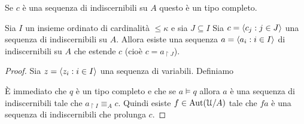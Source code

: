 \begin{comment}


\def\EMtp{{\rm {\small EM}\mbox{-}tp}}

Sia $I$ un insieme infinito linearmente ordinato e sia $c=\<c_i: i\in I\>$. Sia $x$ una tupla di variabili di lunghezza $\omega$. Scriveremo $p(x)=\EMtp(c/A)$ e diremo che $p(x)$ \`e il tipo di Erenfeucht-Mostowski di $c$ su $A$ se

\ceq{\hfill p(x)}{=}{\Big\{\phi(x_{\restriction n})\in L(A) \ :\ \phi(c') \textrm{ per ogni } c'\sqsubseteq c,\ |c'|=n<\omega \Big\}} 
 
\end{comment}

Se $c$ \`e una sequenza di indiscernibili su $A$ questo \`e un tipo completo.
% 
% 
% 
% 
% 


\begin{proposition}
Sia $I$ un insieme ordinato di cardinalit\`a $\le\kappa$ e sia $J\subseteq I$ Sia $c=\langle c_j:j\in J\rangle$ una sequenza di indiscernibili su $A$. Allora esiste una sequenza $a=\langle a_i:i\in I\rangle$ di indiscernibili su $A$ che estende $c$ (cio\`e $c=a_{\restriction J}$).
\end{proposition}

\begin{proof}
Sia $z=\langle z_i:i\in I\rangle$ una sequenza di variabili. Definiamo


\`E immediato che $q$ \`e un tipo completo e che se $a\models q$ allora $a$ \`e una sequenza di indiscernibili tale che $a_{\restriction I}\equiv_A c$. Quindi esiste $f\in\textrm{Aut}(\EuScript U/A)$ tale che $fa$ \`e una sequenza di indiscernibili che prolunga $c$.
\end{proof}



